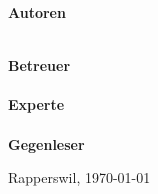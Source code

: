 \begin{titlepage}
	\begin{minipage}{\linewidth}
	\begin{minipage}[t]{0.33\linewidth}
		\Large \textbf{Autoren} \\
		\Large \ubos \\
		\Large \pchr
	\end{minipage}
	\hfill\begin{minipage}[t]{0.5\linewidth}
		\Large \textbf{Betreuer} \\
		\Large \proff \\
		\textbf{\Large Experte}\\
		\Large \examm \\
		\textbf{\Large Gegenleser}\\
		\Large \msto
	\end{minipage}
	\end{minipage}

	\begin{minipage}{0.33\linewidth}

	\end{minipage}
	\begin{minipage}{0.33\linewidth}


	\end{minipage}
	\begin{minipage}{0.33\linewidth}

	\end{minipage}
	\vfill
	\Large Rapperswil, \today

\end{titlepage}

\restoregeometry
